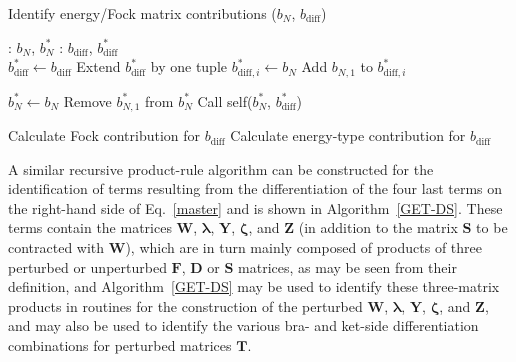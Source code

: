 \documentclass[%
 reprint,
 amsmath,amssymb,
 aps,
]{revtex4-1}
\begin{document}
\begin{algorithm}
\caption{Identify energy/Fock matrix contributions ($b_{N}$, $b_{\text{diff}}$)}
\label{ID-CALC-FOCK}
\begin{algorithmic}
: $b_{N}$, $b_{N}^{*}$
: $b_{\text{diff}}$, $b_{\text{diff}}^{*}$\\

         \State $b_{\text{diff}}^{*} \gets b_{\text{diff}}$
            \State Extend $b_{\text{diff}}^{*}$ by one tuple
            \State $b_{\text{diff}, i}^{*} \gets b_{N}$
         \Else
            \State Add $b_{N, 1}$ to $b_{\text{diff}, i}^{*}$
         \EndIf

         \State $b_{N}^{*} \gets b_{N}$
         \State Remove $b_{N, 1}^{*}$ from $b_{N}^{*}$
         \State Call self($b_{N}^{*}$, $b_{\text{diff}}^{*}$)
      \EndFor
   \Else

                  \State Calculate Fock contribution for $b_{\text{diff}}$
               \EndIf
               \State Calculate energy-type contribution for $b_{\text{diff}}$
            \EndIf
         \EndIf
      \EndIf
   \EndIf
\end{algorithmic}
\end{algorithm}

A similar recursive product-rule algorithm can be constructed for the
identification of terms resulting from the differentiation of the four last
terms on the right-hand side of Eq.~\eqref{master} and is shown in
Algorithm~\ref{GET-DS}. These terms contain the matrices $\mathbf{W}$,
$\mathbf{\lambda}$, $\mathbf{Y}$, $\mathbf{\zeta}$, and $\mathbf{Z}$ (in
addition to the matrix $\mathbf{S}$ to be contracted with $\mathbf{W}$), which
are in turn mainly composed of products of three perturbed or unperturbed
$\mathbf{F}$, $\mathbf{D}$ or $\mathbf{S}$ matrices, as may be seen from their
definition, and Algorithm~\ref{GET-DS} may be used to identify these
three-matrix products in routines for the construction of the perturbed
$\mathbf{W}$, $\mathbf{\lambda}$, $\mathbf{Y}$, $\mathbf{\zeta}$, and
$\mathbf{Z}$, and may also be used to identify the various bra- and ket-side
differentiation combinations for perturbed matrices $\mathbf{T}$.
\end{document}
